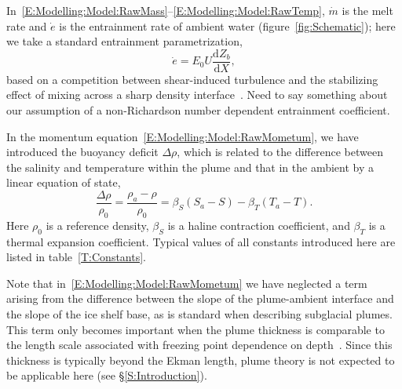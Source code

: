 \documentclass{jfm}
\newcommand{\dd}[2]{\frac{\mathrm{d} #1}{\mathrm{d} #2}}
\newcommand{\red}[1]{{\color{red} #1}}
\begin{document}
In~\eqref{E:Modelling:Model:RawMass}--\eqref{E:Modelling:Model:RawTemp}, $\dot{m}$ is the melt rate and $\dot{e}$ is the entrainment rate of ambient water (figure~\ref{fig:Schematic}); here we take a standard entrainment parametrization, 
\begin{equation}\label{E:Modelling:Model:Entrainment}
\dot{e} = E_0 U \dd{Z_b}{X},
\end{equation}
based on a competition between shear-induced turbulence and the stabilizing effect of mixing across a sharp density interface~\citep{Pedersen1980,Turner1986JFM}. \red{Need to say something about our assumption of a non-Richardson number dependent entrainment coefficient.}

In the momentum equation~\eqref{E:Modelling:Model:RawMometum}, we have introduced the buoyancy deficit $\Delta \rho$, which is related to the difference between the salinity and temperature within the plume and that in the ambient by a linear equation of state,
\begin{equation}\label{E:Modelling:Model:EquationOfState}
\frac{\Delta \rho}{\rho_0}  = \frac{\rho_a - \rho}{\rho_0}= \beta_S(S_a - S) - \beta_T (T_a - T).
\end{equation}
Here $\rho_0$ is a reference density, $\beta_S$ is a haline contraction coefficient, and $\beta_T$ is a thermal expansion coefficient. Typical values of all constants introduced here are listed in table~\ref{T:Constants}.

Note that in~\eqref{E:Modelling:Model:RawMometum} we have neglected a term arising from the difference between the slope of the plume-ambient interface and the slope of the ice shelf base, as is standard when describing subglacial plumes. This term only becomes important when the plume thickness is comparable to the length scale associated with freezing point dependence on depth~\citep{Jenkins2011JPhysOcean}. Since this thickness is typically beyond the Ekman length, plume theory is not expected to be applicable here (see \S\ref{S:Introduction}).
\end{document}

